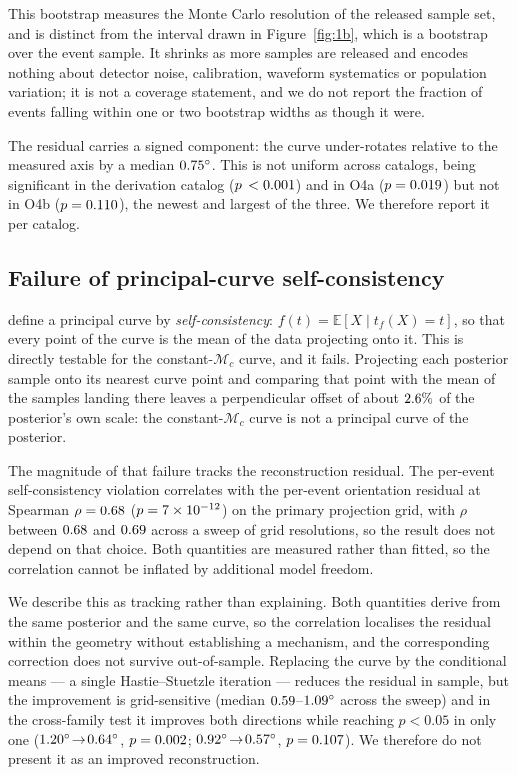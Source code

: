 \documentclass[aps,prd,twocolumn,amsmath,amssymb,nofootinbib,superscriptaddress]{revtex4-2}
\begin{document}
This bootstrap measures the Monte Carlo resolution of the released sample set, and is distinct from the
interval drawn in Figure~\ref{fig:1b}, which is a bootstrap over the event sample. It shrinks as more samples
are released and encodes nothing about detector noise, calibration, waveform systematics or population
variation; it is not a coverage statement, and we do not report the fraction of events falling within one
or two bootstrap widths as though it were.

The residual carries a signed component: the curve under-rotates relative to the measured axis by a median
$0.75^\circ$. This is not uniform across catalogs, being significant in the derivation catalog
($p\,<0.001$) and in O4a ($p=0.019$) but not in O4b ($p=0.110$), the newest and largest
of the three. We therefore report it per catalog.

\subsection{Failure of principal-curve self-consistency}
\label{sec:selfcons}
\citet{HastieStuetzle1989} define a principal curve by \emph{self-consistency}: $f(t) = \mathbb{E}[X \mid
t_f(X) = t]$, so that every point of the curve is the mean of the data projecting onto it. This is directly
testable for the constant-$\mathcal{M}_c$ curve, and it fails. Projecting each posterior sample onto its
nearest curve point and comparing that point with the mean of the samples landing there leaves a
perpendicular offset of about $2.6\%$ of the posterior's own scale: the constant-$\mathcal{M}_c$
curve is not a principal curve of the posterior.

The magnitude of that failure tracks the reconstruction residual. The per-event self-consistency violation
correlates with the per-event orientation residual at Spearman $\rho=0.68$ ($p=7\times10^{-12}$) on the primary
projection grid, with $\rho$ between $0.68$ and $0.69$ across a sweep of grid resolutions, so
the result does not depend on that choice. Both quantities are measured rather than fitted, so the
correlation cannot be inflated by additional model freedom.

We describe this as tracking rather than explaining. Both quantities derive from the same posterior and the
same curve, so the correlation localises the residual within the geometry without establishing a mechanism,
and the corresponding correction does not survive out-of-sample. Replacing the curve by the conditional
means --- a single Hastie--Stuetzle iteration --- reduces the residual in sample, but the improvement is
grid-sensitive (median $0.59$--$1.09^\circ$ across the sweep) and in the cross-family test
it improves both directions while reaching $p<0.05$ in only one
($1.20^\circ\!\to\!0.64^\circ$, $p=0.002$;
$0.92^\circ\!\to\!0.57^\circ$, $p=0.107$). We therefore do not present it as an
improved reconstruction.
\end{document}
